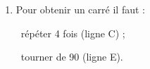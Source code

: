\begin{enumerate}
Il suffit de garder la taille de l'hexagone dessiné par le Motif : il suffit donc de supprimer la ligne 9.

Dans le programme il faut à la ligne 5 mettre : répéter 6 fois.
\item %
Pour obtenir un carré il faut :

\starredbullet~répéter 4 fois (ligne C) ;

\starredbullet~tourner de 90\degres{} (ligne E).
\end{enumerate}

\bigskip

